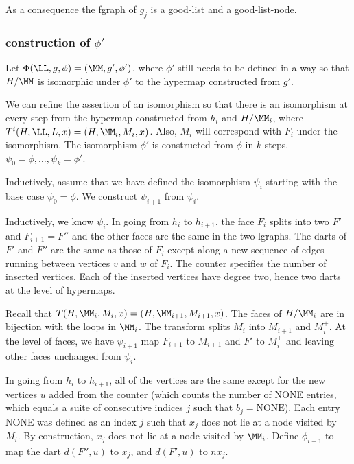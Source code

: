 As a consequence the fgraph of $g_j$ is a good-list and a
good-list-node.

\subsubsection{construction of $\phi'$}

Let $\Phi(\LL,g,\phi) = (\MM,g',\phi')$, where $\phi'$ still
needs to be defined in a way so that $H/\MM$ is isomorphic
under $\phi'$ to the hypermap constructed from $g'$.

We can refine the assertion of an isomorphism so that there is an
isomorphism at every step from the hypermap constructed from $h_i$ and $H/\MM_i$, where $T^i(H,\LL,L,x) = (H,\MM_i,M_i,x)$.  Also, $M_i$ will
correspond with $F_i$ under the isomorphism.  The isomorphism $\phi'$
is constructed from $\phi$ in $k$ steps.  $\psi_0 = \phi,\ldots,\psi_k
= \phi'$.


Inductively, assume that we have defined the isomorphism $\psi_i$
starting with the base case $\psi_0=\phi$.  We construct $\psi_{i+1}$
from $\psi_i$.  

Inductively, we know $\psi_i$.  In going from $h_i$ to $h_{i+1}$, the
face $F_i$ splits into two $F'$ and $F_{i+1}=F''$ and the other faces
are the same in the two lgraphs.  The darts of $F'$ and $F''$ are the
same as those of $F_i$ except along a new sequence of edges running
between vertices $v$ and $w$ of $F_i$.  The counter specifies the
number of inserted vertices.  Each of the inserted vertices have
degree two, hence two darts at the level of hypermaps.

Recall that  $T(H,\MM_i,M_i,x) = (H,\MM_{i+1},M_{i+1},x)$.  The
faces of $H/\MM_i$ are in bijection with the loops in $\MM_i$. 
The transform splits $M_i$ into $M_{i+1}$ and $M_i^+$.  At the level
of faces, we have $\psi_{i+1}$ map $F_{i+1}$ to $M_{i+1}$ and $F'$
to $M_i^+$ and leaving other faces unchanged from $\psi_i$.

In going from $h_i$ to $h_{i+1}$, all of the vertices are the same
except for the new vertices $u$ added from the counter (which counts
the number of NONE entries, which equals a suite of consecutive
indices $j$ such that $b_j = \text{NONE}$).  Each entry NONE was
defined as an index $j$ such that $x_j$ does not lie at a node visited
by $M_i$.  By construction, $x_j$ does not
lie at a node visited by $\MM_i$.  Define $\phi_{i+1}$ to map the dart
$d(F'',u)$ to $x_j$, and $d(F',u)$ to $n x_j$.

